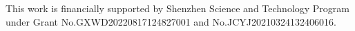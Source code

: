 \documentclass[sigconf,anonymous]{aamas}
\begin{document}
\begin{acks}
  This work is financially supported by Shenzhen Science and Technology Program 
  under Grant No.GXWD20220817124827001 and No.JCYJ20210324132406016.
\end{acks}



 


\end{document}

